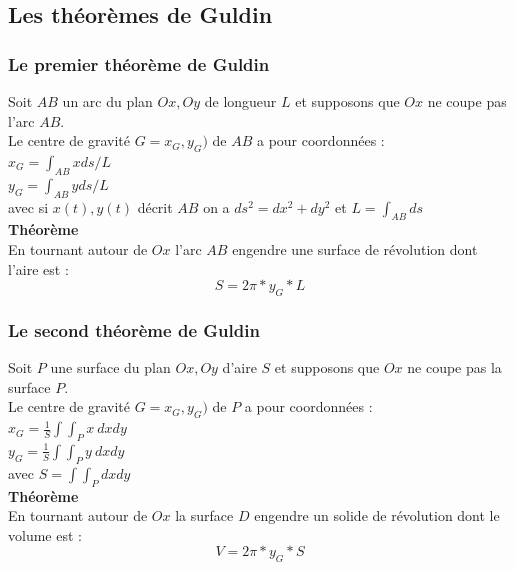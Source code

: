 \documentclass[a4paper,11pt]{book}
\begin{document}
\subsection{Les th\'eor\`emes de Guldin}
\subsubsection{Le premier th\'eor\`eme de Guldin}
Soit $AB$ un arc du plan $Ox,Oy$ de longueur $L$ et supposons que $Ox$ ne 
coupe pas l'arc $AB$.\\
Le centre de gravit\'e $G=x_G,y_G)$ de $AB$ a pour coordonn\'ees :\\
$x_G=\int_{AB}xds/L$\\
$y_G=\int_{AB}yds/L$\\
avec si $x(t),y(t)$ d\'ecrit $AB$ on a $ds^2=dx^2+dy^2$ et $L=\int_{AB}ds$ \\
{\bf Th\'eor\`eme} \\
En tournant autour de $Ox$ l'arc $AB$ engendre une surface de r\'evolution dont 
l'aire est :
$$S=2\pi*y_G*L$$
\subsubsection{Le second th\'eor\`eme de Guldin}
Soit $P$ une surface du plan $Ox,Oy$ d'aire $S$ et  supposons que $Ox$ ne 
coupe pas la surface $P$.\\
Le centre de gravit\'e $G=x_G,y_G)$ de $P$ a pour coordonn\'ees :\\
$x_G=\frac{1}{S}\int\int_{P}x\ dxdy$\\
$y_G=\frac{1}{S}\int\int_{P}y\ dxdy$\\ 
avec $S=\int\int_P dxdy$\\
{\bf Th\'eor\`eme} \\
En tournant autour de $Ox$ la surface $D$ engendre un solide de r\'evolution 
dont le volume est :
$$V=2\pi*y_G*S$$
\end{document}
